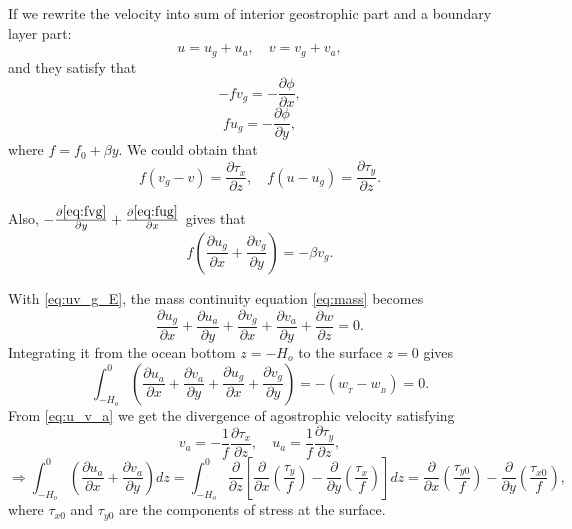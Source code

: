 \documentclass[a4paper]{article}
\begin{document}
\begin{enumerate}[label=\textbf{\arabic*.}]
\begin{enumerate}[label=\textbf{(\alph*)}]
		If we rewrite the velocity into sum of interior geostrophic part and a boundary layer part:
		\begin{equation}\label{eq:uv_g_E}
			u=u_g+u_{a}, \quad v=v_g+v_{a},
		\end{equation}
		and they satisfy that
		\begin{equation}\label{eq:fvg}
			-f v _ { g }  = -\frac { \partial{ \phi } } { \partial x },
		\end{equation}
		\begin{equation}\label{eq:fug}
			f u _ { g }  =- \frac { \partial{ \phi } } { \partial y },
		\end{equation}
		where $f=f_0+\beta y.$ We could obtain that
		\begin{equation}\label{eq:u_v_a}
		f \left( v _ { g } - v \right) = \frac { \partial{ \tau } _ { x } } { \partial z } ,\quad f \left( u - u _ { g } \right) = \frac { \partial { \tau } _ { y } } { \partial z }.
		\end{equation}
		
		Also, $-\frac{\partial \eqref{eq:fvg}}{\partial y}+\frac{\partial \eqref{eq:fug}}{\partial x}$ gives that
		\begin{equation}\label{eq:ug_vg_geo}
			f \left( \frac { \partial u _ { g } } { \partial x } + \frac { \partial v _ { g } } { \partial y } \right) = - \beta v _ { g }.
		\end{equation}
		
		With \eqref{eq:uv_g_E}, the mass continuity equation \eqref{eq:mass} becomes 
		$$	\frac { \partial u_g } { \partial x } + \frac { \partial u_a } { \partial y } +\frac { \partial v_g } { \partial x } + \frac { \partial v_a } { \partial y }+ \frac { \partial w } { \partial z } = 0.$$
		Integrating it from the ocean bottom $z=-H_o$ to the surface $z=0$ gives
		\begin{equation}\label{eq:int_u_v_He}
			\int _ { - H _ { o} } ^ { 0} \left( \frac { \partial u _ { a } } { \partial x } + \frac { \partial v _ { a } } { \partial y } + \frac { \partial u _ { g } } { \partial x } + \frac { \partial v _ { g } } { \partial y } \right)=-(w_{_T}-w_{_B})=0.
		\end{equation}
		From \eqref{eq:u_v_a} we get the divergence of agostrophic velocity satisfying 
		\begin{equation}\label{eq:ua_va}
			v_a = -\frac{1}{f}\frac{\partial  \tau_{x}}{\partial z},\quad u_a = \frac{1}{f}\frac{\partial  \tau_{y}}{\partial z},
		\end{equation}
		$$\Longrightarrow \int _ { - H _ { o} } ^ { 0} \left( \frac { \partial u _ { a } } { \partial x } + \frac { \partial v _ { a } } { \partial y }\right)dz=\int_{ -H_o }^{0}\frac { \partial } {\partial z} \left[\frac{\partial }{\partial x} \left(\frac{\tau_y}{f}\right)- \frac{\partial }{\partial y}\left(\frac{\tau_x}{f}\right) \right] dz =  \frac { \partial } { \partial x } \left( \frac { \tau  _ { y 0} } { f } \right) - \frac { \partial } { \partial y } \left( \frac { \tau _ { x0} } { f } \right),$$
		where $\tau_{x0}$ and $\tau_{y0}$ are the components of stress at the surface.
		

\end{enumerate}
\end{enumerate}
\end{document}
